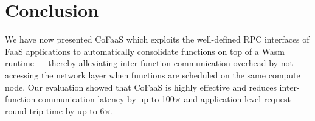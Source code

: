 \section{Conclusion}

We have now presented CoFaaS which exploits the well-defined RPC interfaces of FaaS applications to automatically consolidate functions on top of a Wasm runtime --- thereby alleviating inter-function communication overhead by not accessing the network layer when functions are scheduled on the same compute node. Our evaluation showed that CoFaaS is highly effective and reduces inter-function communication latency by up to 100$\times$ and application-level request round-trip time by up to 6$\times$.

